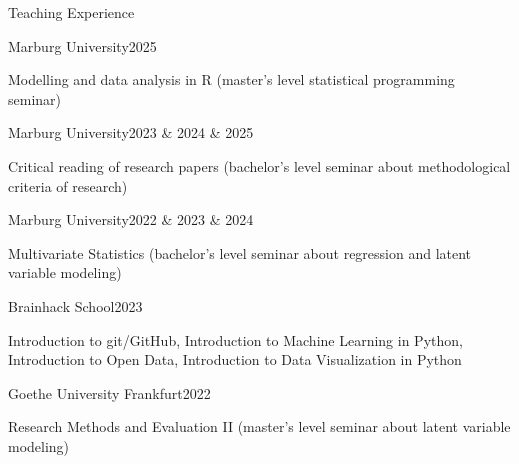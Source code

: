 \documentclass{resume} %
\begin{document}
\begin{rSection}{Teaching Experience}

\begin{rSubsection}{Marburg University}{2025}{}
\item
\item[] Modelling and data analysis in R (master's level statistical programming seminar)
\end{rSubsection}

\begin{rSubsection}{Marburg University}{2023 \& 2024 \& 2025}{}
\item
\item[] Critical reading of research papers (bachelor's level seminar about methodological criteria of research)
\end{rSubsection}

\begin{rSubsection}{Marburg University}{2022 \& 2023 \& 2024}{}
\item
\item[] Multivariate Statistics (bachelor's level seminar about regression and latent variable modeling)
\end{rSubsection}

\begin{rSubsection}{Brainhack School}{2023}{}
\item
\item[] Introduction to git/GitHub, Introduction to Machine Learning in Python, Introduction to Open Data, Introduction to Data Visualization in Python
\end{rSubsection}


\begin{rSubsection}{Goethe University Frankfurt}{2022}{}
\item
\item[] Research Methods and Evaluation II (master's level seminar about latent variable modeling)
\end{rSubsection}

\end{rSection}
\end{document}
